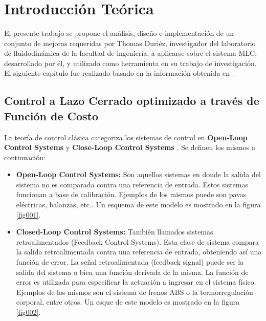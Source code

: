 \documentclass[a4paper,10pt]{article}
\title{  }
\begin{document}
	\maketitle %
	\newpage

	\tableofcontents
	\newpage

    \section{Introducción Teórica} \label{sec:intro}
        El presente trabajo se propone el análisis, diseño e implementación de un conjunto de mejoras requeridas por Thomas Duriéz,
        investigador del laboratorio de fluidodinámica de la facultad de ingeniería, a aplicarse sobre el sistema MLC, desarrollado por él,
        y utilizado como herramienta en su trabajo de investigación. El siguiente capítulo fue realizado basado en la información obtenida
        en \cite{Duriez2016}.

        \subsection{Control a Lazo Cerrado optimizado a través de Función de Costo} \label{sec:close_loop}
        La teoría de control clásica categoriza los sistemas de control en \textbf{Open-Loop Control Systems} y
        \textbf{Close-Loop Control Systems} \cite{Ogata2002}. Se definen los mismos a continuación:

        \begin{itemize}
            \item \textbf{Open-Loop Control Systems:} Son aquellos sistemas en donde la salida del sistema no es comparada contra una
            referencia de entrada. Estos sistemas funcionan a base de calibración. Ejemplos de los mismos puede son pavas eléctricas,
            balanzas, etc.. Un esquema de este modelo es mostrado en la figura \ref{fig001}.
            \item \textbf{Closed-Loop Control Systems:} También llamados sistemas retroalimentados (Feedback Control Systems). Esta clase
            de sistema compara la salida retroalimentada contra una referencia de entrada, obteniendo así una función de error. La señal
            retroalimentada (feedback signal) puede ser la salida del sistema o bien una función derivada de la misma. La función de error
            es utilizada para especificar la actuación a ingresar en el sistema físico. Ejemplos de los mismos son el sistema de frenos
            ABS o la termorregulación corporal, entre otros. Un esque de este modelo es mostrado en la figura \ref{fig002}.
        \end{itemize}
\end{document}
